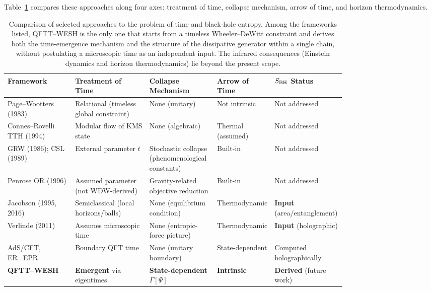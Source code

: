 \documentclass[12pt,a4paper]{article}
\newcommand{\Gtime}{\Gamma[\Psi]}
\numberwithin{equation}{section}
\begin{document}
\medskip
\noindent Table~\ref{tab:framework-comparison} compares these approaches along four axes: treatment of time, collapse mechanism, arrow of time, and horizon thermodynamics.

\vspace{0.3cm}

\begin{table}[H]
\centering
\small
\setlength{\tabcolsep}{5pt}
\renewcommand{\arraystretch}{1.2}
\begin{tabularx}{\linewidth}{
  >{\raggedright\arraybackslash}p{0.20\linewidth}
  >{\raggedright\arraybackslash}p{0.22\linewidth}
  >{\raggedright\arraybackslash}p{0.20\linewidth}
  >{\raggedright\arraybackslash}p{0.16\linewidth}
  >{\raggedright\arraybackslash}X}
\toprule
\textbf{Framework} & \textbf{Treatment of Time} & \textbf{Collapse Mechanism} & \textbf{Arrow of Time} & \textbf{$S_{\rm BH}$ Status}\\
\midrule
Page--Wootters (1983) & Relational (timeless global constraint) & None (unitary) & Not intrinsic & Not addressed \\
Connes--Rovelli TTH (1994) & Modular flow of KMS state & None (algebraic) & Thermal (assumed) & Not addressed \\
GRW (1986); CSL (1989) & External parameter $t$ & Stochastic collapse (phenomenological constants) & Built-in & Not addressed \\
Penrose OR (1996) & Assumed parameter (not WDW-derived) & Gravity-related objective reduction & Built-in & Not addressed \\
Jacobson (1995, 2016) & Semiclassical (local horizons/balls) & None (equilibrium condition) & Thermodynamic & \textbf{Input} (area/entanglement) \\
Verlinde (2011) & Assumes microscopic time & None (entropic-force picture) & Thermodynamic & \textbf{Input} (holographic) \\
AdS/CFT, ER=EPR & Boundary QFT time & None (unitary boundary) & State-dependent & Computed holographically \\
\textbf{QFTT--WESH} & \textbf{Emergent} via eigentimes & \textbf{State-dependent} $\Gtime$ & \textbf{Intrinsic} & \textbf{Derived} (future work)\\
\bottomrule
\end{tabularx}
\caption{Comparison of selected approaches to the problem of time and black-hole entropy. Among the frameworks listed, QFTT--WESH is the only one that starts from a timeless Wheeler--DeWitt constraint and derives both the time-emergence mechanism and the structure of the dissipative generator within a single chain, without postulating a microscopic time as an independent input. The infrared consequences (Einstein dynamics and horizon thermodynamics) lie beyond the present scope.}
\label{tab:framework-comparison}
\end{table}
\end{document}
